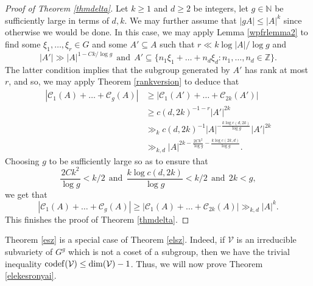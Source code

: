 \documentclass[12pt, reqno]{amsart}
\theoremstyle{remark}
\theoremstyle{definition}
\numberwithin{equation}{section}
\begin{document}
\begin{proof}[Proof of Theorem \ref{thmdelta}]
    Let $k \geq 1$ and $d \geq 2$ be integers, let $g \in \mathbb{N}$ be sufficiently large in terms of $d,k$.  We may further assume that $|gA| \leq |A|^k$ since otherwise we would be done. In this case, we may apply Lemma \ref{wpfrlemma2} to find some $\xi_1, \dots, \xi_r \in G$ and some $A' \subseteq A$ such that $r \ll k \log |A|/ \log g$ and
    \[|A'| \gg |A|^{1 - Ck/\log g}  \ \ \text{and} \ \  A' \subseteq \{ n_1 \xi_1 + \dots + n_d \xi_d : n_1, \dots, n_d \in \mathbb{Z} \}. \]
    The latter condition implies that the subgroup generated by $A'$ has rank at most $r$, and so, we may apply Theorem \ref{rankversion} to deduce that
    \begin{align*}
    |\mathcal{C}_1(A) + \dots + \mathcal{C}_g(A)| &  \geq |\mathcal{C}_1(A') + \dots + \mathcal{C}_{2k}(A')| \\
    & \geq c(d,2k)^{-1 - r} |A'|^{2k} \\
    & \gg_{k} c(d,2k)^{-1} |A|^{-\frac{k \log c(d,2k)}{\log g}} |A'|^{2k} \\
    & \gg_{k,d} |A|^{2k - \frac{2Ck^2}{\log g} - \frac{k\log c(2k,d)}{\log g}}.
    \end{align*}
    Choosing $g$ to be sufficiently large so as to ensure that 
    \[ \frac{2Ck^2}{\log g} < k/2 \ \ \text{and}  \ \ \frac{k\log c(d,2k)} {\log g} < k/2 \ \ \text{and} \ \ 2k < g,\]  
    we get that
    \[ |\mathcal{C}_1(A) + \dots + \mathcal{C}_g(A)| \geq |\mathcal{C}_1(A) + \dots + \mathcal{C}_{2k}(A)| \gg_{k,d} |A|^{k}. \]
    This finishes the proof of Theorem \ref{thmdelta}.
\end{proof}

Theorem \ref{esz} is a special case of Theorem \ref{elsz}. Indeed, if $\mathcal{V}$ is an irreducible subvariety of $G^g$ which is not a coset of a subgroup, then we have the trivial inequality ${\rm codef}(\mathcal{V}) \leq {\rm dim}(\mathcal{V})-1$. Thus, we will now prove Theorem \ref{elekesronyai}.


    
\end{document}
